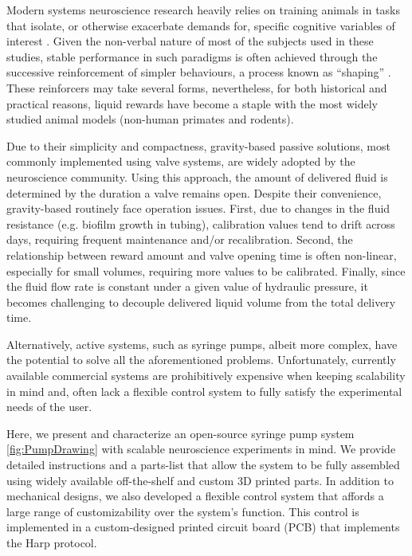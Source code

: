 Modern systems neuroscience research heavily relies on training animals in tasks that isolate, or otherwise exacerbate demands for, specific cognitive variables of interest \citep{Gomez-Marin2016}. Given the non-verbal nature of most of the subjects used in these studies, stable performance in such paradigms is often achieved through the successive reinforcement of simpler behaviours, a process known as “shaping” \citep{Jones1939}. These reinforcers may take several forms, nevertheless, for both historical and practical reasons, liquid rewards have become a staple with the most widely studied animal models (non-human primates and rodents)\citep{Guo2014}. 

Due to their simplicity and compactness, gravity-based passive solutions, most commonly implemented using valve systems, are widely adopted by the neuroscience community. Using this approach, the amount of delivered fluid is determined by the duration a valve remains open. Despite their convenience, gravity-based routinely face operation issues. First, due to changes in the fluid resistance (e.g. biofilm growth in tubing), calibration values tend to drift across days, requiring frequent maintenance and/or recalibration. Second, the relationship between reward amount and valve opening time is often non-linear, especially for small volumes, requiring more values to be calibrated. Finally, since the fluid flow rate is constant under a given value of hydraulic pressure, it becomes challenging to decouple delivered liquid volume from the total delivery time.

Alternatively, active systems, such as syringe pumps, albeit more complex, have the potential to solve all the aforementioned problems. Unfortunately, currently available commercial systems are prohibitively expensive when keeping scalability in mind and, often lack a flexible control system to fully satisfy the experimental needs of the user.

Here, we present and characterize an open-source syringe pump system \ref{fig:PumpDrawing} with scalable neuroscience experiments in mind. We provide detailed instructions and a parts-list that allow the system to be fully assembled using widely available off-the-shelf and custom 3D printed parts. 
In addition to mechanical designs, we also developed a flexible control system that affords a large range of customizability over the system's function. This control is implemented in a custom-designed printed circuit board (PCB) that implements the Harp protocol.


